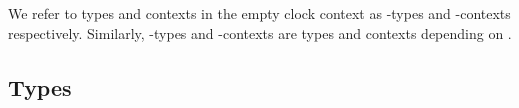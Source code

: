 \begin{code}%
\>[0]\AgdaSpace{}%
\AgdaSpace{}%
\AgdaSymbol{:}\AgdaSpace{}%
\AgdaSpace{}%
\<%
\\
\>[0][@{}l@{\AgdaIndent{0}}]%
\>[2]\AgdaSpace{}%
\AgdaSymbol{:}\AgdaSpace{}%
\<%
\\
%
\>[2]\AgdaSpace{}%
\AgdaSymbol{:}\AgdaSpace{}%
\<%
\end{code}
We refer to types and contexts in the empty clock context as -types and
-contexts respectively. Similarly,  -types and
-contexts are types and contexts depending on .

\subsection{Types}

